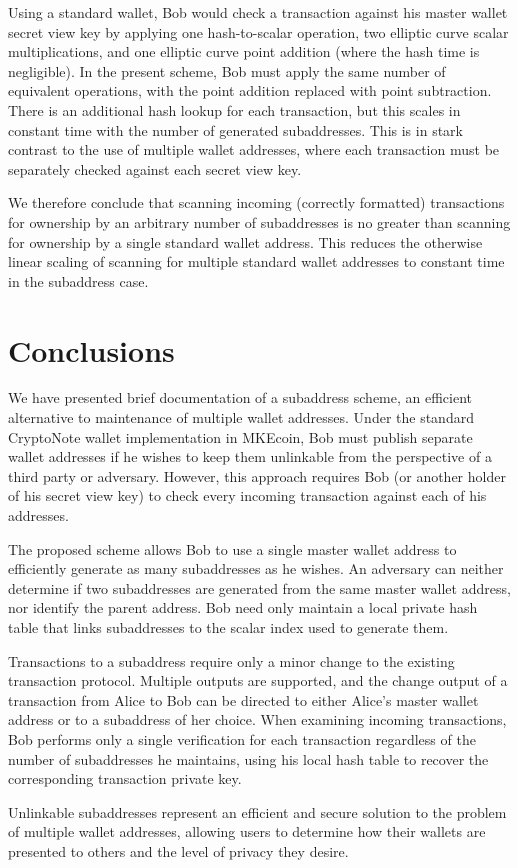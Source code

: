 \documentclass{mrl}
\begin{document}
Using a standard wallet, Bob would check a transaction against his master wallet secret view key by applying one hash-to-scalar operation, two elliptic curve scalar multiplications, and one elliptic curve point addition (where the hash time is negligible). In the present scheme, Bob must apply the same number of equivalent operations, with the point addition replaced with point subtraction. There is an additional hash lookup for each transaction, but this scales in constant time with the number of generated subaddresses. This is in stark contrast to the use of multiple wallet addresses, where each transaction must be separately checked against each secret view key.

We therefore conclude that scanning incoming (correctly formatted) transactions for ownership by an arbitrary number of subaddresses is no greater than scanning for ownership by a single standard wallet address. This reduces the otherwise linear scaling of scanning for multiple standard wallet addresses to constant time in the subaddress case.


\section{Conclusions}
We have presented brief documentation of a subaddress scheme, an efficient alternative to maintenance of multiple wallet addresses. Under the standard CryptoNote wallet implementation in MKEcoin, Bob must publish separate wallet addresses if he wishes to keep them unlinkable from the perspective of a third party or adversary. However, this approach requires Bob (or another holder of his secret view key) to check every incoming transaction against each of his addresses.

The proposed scheme allows Bob to use a single master wallet address to efficiently generate as many subaddresses as he wishes. An adversary can neither determine if two subaddresses are generated from the same master wallet address, nor identify the parent address. Bob need only maintain a local private hash table that links subaddresses to the scalar index used to generate them.

Transactions to a subaddress require only a minor change to the existing transaction protocol. Multiple outputs are supported, and the change output of a transaction from Alice to Bob can be directed to either Alice's master wallet address or to a subaddress of her choice. When examining incoming transactions, Bob performs only a single verification for each transaction regardless of the number of subaddresses he maintains, using his local hash table to recover the corresponding transaction private key.

Unlinkable subaddresses represent an efficient and secure solution to the problem of multiple wallet addresses, allowing users to determine how their wallets are presented to others and the level of privacy they desire.



\end{document}
